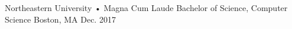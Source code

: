 


\begin{cventries}

  \cventry
    {Northeastern University • Magna Cum Laude} %
    {Bachelor of Science, Computer Science} %
    {Boston, MA} %
    {Dec. 2017} %
    {}

\end{cventries}
